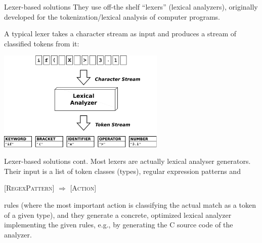 \documentclass[style=upen, size=14pt]{powerdot}
\theoremstyle{definition}
\begin{document}
\begin{slide}[toc=Lexers]{Lexer-based solutions}
  They use off-the shelf ``lexers'' (lexical analyzers), originally developed
  for the tokenization/lexical analysis of computer programs.

  A typical lexer takes a character stream as input and produces a stream of
  classified tokens from it:

  \begin{center}
    \includegraphics[width=0.6\textwidth]{figures/lexer.eps}
  \end{center}
\end{slide}

\begin{slide}[toc=]{Lexer-based solutions cont.}
  Most lexers are actually lexical analyser generators. Their input is a list of
  token classes (types), regular expression patterns and\smallskip

  \begin{center}
    [\textsc{RegexPattern}] $\Rightarrow$ [\textsc{Action}]\smallskip
  \end{center}

rules (where the most important action is classifying the actual match as a
token of a given type), and they generate a concrete, optimized lexical analyzer
implementing the given rules, e.g., by generating the C source code of the
analyzer.
\end{slide}
\end{document}

